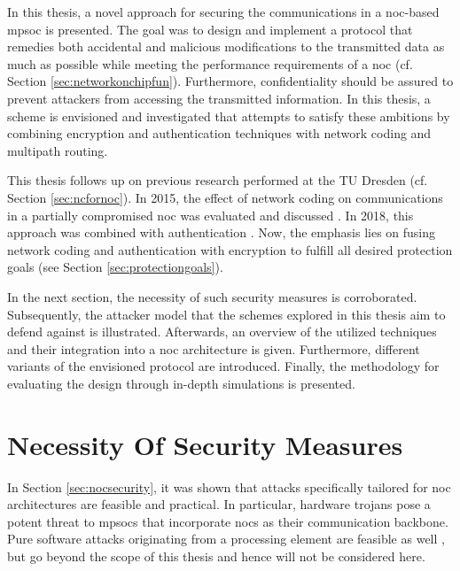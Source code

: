 In this thesis, a novel approach for securing the communications in a \gls{noc}-based \gls{mpsoc} is presented. The goal was to design and implement a protocol that
remedies both accidental and malicious modifications to the transmitted data as much as possible while meeting the performance requirements of a \gls{noc} (cf. Section
\ref{sec:networkonchipfun}). Furthermore, confidentiality should be assured to prevent attackers from accessing the transmitted information. In this
thesis, a scheme is envisioned and investigated that attempts to satisfy these ambitions by combining encryption and authentication techniques with
network coding and multipath routing.

This thesis follows up on previous research performed at the TU Dresden (cf. Section \ref{sec:ncfornoc}). In 2015, the effect of network coding on
communications in a partially compromised \gls{noc} was evaluated and discussed \cite{moriam15manycorenc}. In 2018, this approach was combined with
authentication \cite{moriam18activeattackers}. Now, the emphasis lies on fusing network coding and authentication with encryption to fulfill all
desired protection goals (see Section \ref{sec:protectiongoals}).

In the next section, the necessity of such security measures is corroborated. Subsequently, the attacker model that the schemes explored in this
thesis aim to defend against is illustrated. Afterwards, an overview of the utilized techniques and their integration
into a \gls{noc} architecture is given. Furthermore, different variants of the envisioned protocol are introduced. Finally, the
methodology for evaluating the design through in-depth simulations is presented.

\section{Necessity Of Security Measures}\label{sec:necessityofsecurity}
In Section \ref{sec:nocsecurity}, it was shown that attacks specifically tailored for \gls{noc} architectures are feasible and practical. In
particular, hardware trojans pose a potent threat to \glspl{mpsoc} that incorporate \glspl{noc} as their communication backbone. Pure software attacks
originating from a processing element are feasible as well \cites(e.g.)(){biswas15routerattack}{kocher04embeddedsecurity}, but go beyond the scope of
this thesis and hence will not be considered here.

